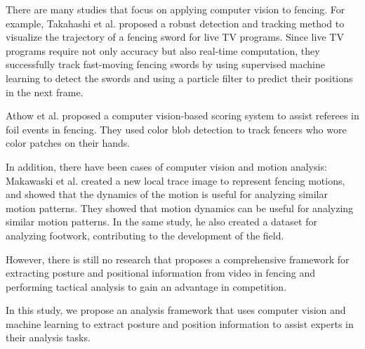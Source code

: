 There are many studies that focus on applying computer vision to fencing. For example, Takahashi\cite{takahashi2020real} et al. proposed a robust detection and tracking method to visualize the trajectory of a fencing sword for live TV programs. Since live TV programs require not only accuracy but also real-time computation, they successfully track fast-moving fencing swords by using supervised machine learning to detect the swords and using a particle filter to predict their positions in the next frame.

Athow\cite{athowusing} et al. proposed a computer vision-based scoring system to assist referees in foil events in fencing. They used color blob detection to track fencers who wore color patches on their hands.

In addition, there have been cases of computer vision and motion analysis: Makawaski et al. \cite{MALAWSKI20181} created a new local trace image to represent fencing motions, and showed that the dynamics of the motion is useful for analyzing similar motion patterns. They showed that motion dynamics can be useful for analyzing similar motion patterns. In the same study, he also created a dataset for analyzing footwork, contributing to the development of the field.

However, there is still no research that proposes a comprehensive framework for extracting posture and positional information from video in fencing and performing tactical analysis to gain an advantage in competition.

In this study, we propose an analysis framework that uses computer vision and machine learning to extract posture and position information to assist experts in their analysis tasks.